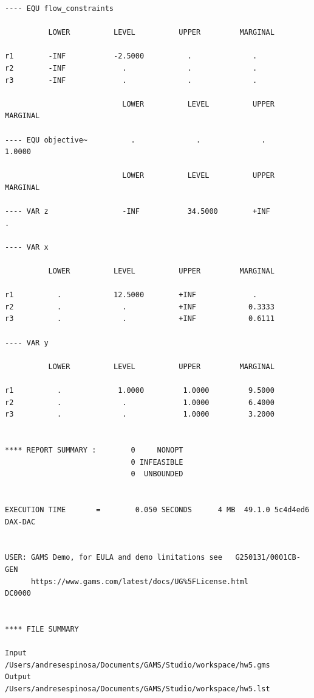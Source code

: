 \documentclass[11pt]{article}
\begin{document}
\begin{verbatim}
---- EQU flow_constraints  

          LOWER          LEVEL          UPPER         MARGINAL

r1        -INF           -2.5000          .              .          
r2        -INF             .              .              .          
r3        -INF             .              .              .          

                           LOWER          LEVEL          UPPER         MARGINAL

---- EQU objective~          .              .              .             1.0000      

                           LOWER          LEVEL          UPPER         MARGINAL

---- VAR z                 -INF           34.5000        +INF             .          

---- VAR x  

          LOWER          LEVEL          UPPER         MARGINAL

r1          .            12.5000        +INF             .          
r2          .              .            +INF            0.3333      
r3          .              .            +INF            0.6111      

---- VAR y  

          LOWER          LEVEL          UPPER         MARGINAL

r1          .             1.0000         1.0000         9.5000      
r2          .              .             1.0000         6.4000      
r3          .              .             1.0000         3.2000      


**** REPORT SUMMARY :        0     NONOPT
                             0 INFEASIBLE
                             0  UNBOUNDED


EXECUTION TIME       =        0.050 SECONDS      4 MB  49.1.0 5c4d4ed6 DAX-DAC


USER: GAMS Demo, for EULA and demo limitations see   G250131/0001CB-GEN
      https://www.gams.com/latest/docs/UG%5FLicense.html         DC0000


**** FILE SUMMARY

Input      /Users/andresespinosa/Documents/GAMS/Studio/workspace/hw5.gms
Output     /Users/andresespinosa/Documents/GAMS/Studio/workspace/hw5.lst

\end{verbatim}
\end{document}

